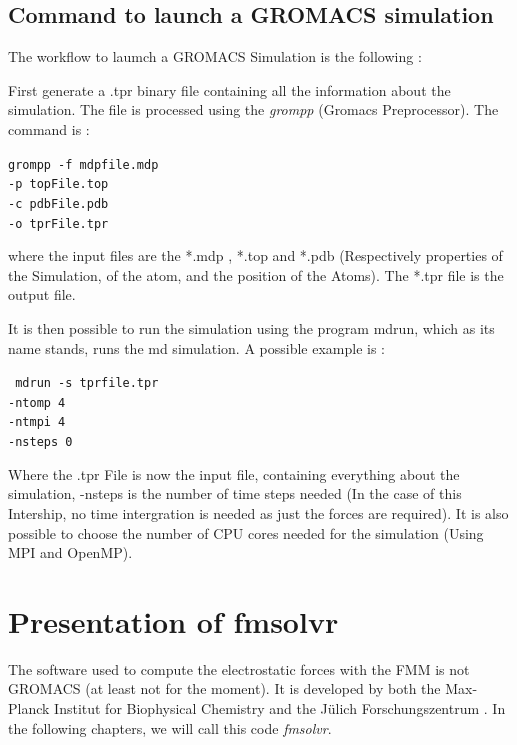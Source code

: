 \documentclass[10pt,twoside,a4paper]{report}
\begin{document}
	\subsection{Command to launch a GROMACS simulation }	
	
The workflow to laumch a GROMACS Simulation is the following : 



First generate a .tpr binary file containing all the information about the simulation. The file is processed using the \textit{grompp} (Gromacs Preprocessor). The command is :


{\centering\tt {grompp -f mdpfile.mdp \\
	 -p topFile.top \\
	 -c pdbFile.pdb \\
	 -o tprFile.tpr \\ 
 }}

\vspace{5mm}
where the input files are the *.mdp , *.top and *.pdb (Respectively properties of the Simulation, of the atom, and the position of the Atoms). The *.tpr file is the output file.

It is then possible to run the simulation using the program mdrun, which as its name stands, runs the md simulation. A possible example is :

{\centering\tt { mdrun -s tprfile.tpr \\
				 -ntomp    4  			\\		
				 -ntmpi    4				 \\
				 -nsteps 0     		  \\  
 }}
 
\vspace{5mm}

Where the .tpr File is now the input file, containing everything about the simulation, -nsteps is the number of time steps needed (In the case of this Intership, no time intergration is needed as just the forces are required). It is also possible to choose the number of CPU cores needed for the simulation (Using MPI and OpenMP).

\section{Presentation of fmsolvr}	

	The software used to compute the electrostatic forces with the FMM is not GROMACS (at least not for the moment). It is developed by both the Max-Planck Institut for Biophysical Chemistry and the Jülich Forschungszentrum . In the following chapters, we will call this code \textit{fmsolvr}. 
	
\end{document}
